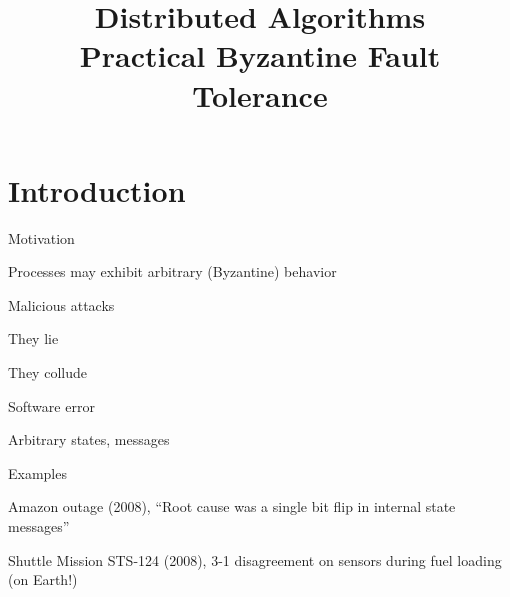 
\title[DS - BFT]{\textbf{Distributed Algorithms}\\Practical Byzantine Fault Tolerance}

\graphicspath{{figs/16/}}

\newcommand{\Retreat}{\textsc{retreat}}

\newcommand{\OM}{\textit{OM}}


\newcommand{\Request}{\textsc{request}}
\newcommand{\Preprepare}{\textsc{pre-prepare}}
\newcommand{\Prepare}{\textsc{prepare}}
\newcommand{\Commit}{\textsc{commit}}
\newcommand{\Reply}{\textsc{reply}}
\newcommand{\Checkpoint}{\textsc{checkpoint}}
\newcommand{\ViewChange}{\textsc{view-change}}
\newcommand{\NewView}{\textsc{new-view}}

\newcommand{\Prepared}{\mathbf{prepared}}
\newcommand{\Committed}{\mathbf{committed}}







\FrameTitle{}
\FrameContent


\section{Introduction}


\begin{frame}{Motivation}

\BI
\item Processes may exhibit arbitrary (Byzantine) behavior
	\BI
	\item Malicious attacks
		\BI
		\item They lie
		\item They collude
		\EI
	\item Software error
		\BI
		\item Arbitrary states, messages
		\EI
	\EI
\EI
	
\begin{block}{Examples}
\BI
\item Amazon outage (2008), “Root cause was a single bit flip in internal state messages”\footnotemark
\item Shuttle Mission STS-124 (2008), 3-1 disagreement on sensors during fuel loading (on Earth!)\footnotemark
\EI
\end{block}

\end{frame}


